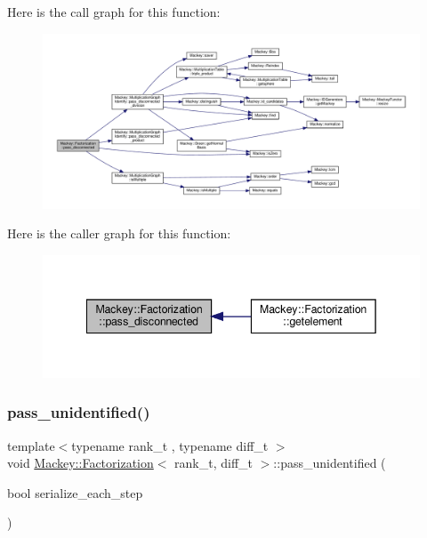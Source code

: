 Here is the call graph for this function\+:\nopagebreak
\begin{figure}[H]
\begin{center}
\leavevmode
\includegraphics[width=350pt]{classMackey_1_1Factorization_aad2d840b523d193f4c3554e9e3f7fb00_cgraph}
\end{center}
\end{figure}
Here is the caller graph for this function\+:\nopagebreak
\begin{figure}[H]
\begin{center}
\leavevmode
\includegraphics[width=342pt]{classMackey_1_1Factorization_aad2d840b523d193f4c3554e9e3f7fb00_icgraph}
\end{center}
\end{figure}
\mbox{\label{classMackey_1_1Factorization_a0f1115a0af9f4fb294646aee85ebb2e4}} 
\subsubsection{\texorpdfstring{pass\+\_\+unidentified()}{pass\_unidentified()}}
{\footnotesize\ttfamily template$<$typename rank\+\_\+t , typename diff\+\_\+t $>$ \\
void \hyperlink{classMackey_1_1Factorization}{Mackey\+::\+Factorization}$<$ rank\+\_\+t, diff\+\_\+t $>$\+::pass\+\_\+unidentified (\begin{DoxyParamCaption}\item[{bool}]{serialize\+\_\+each\+\_\+step }\end{DoxyParamCaption})}



